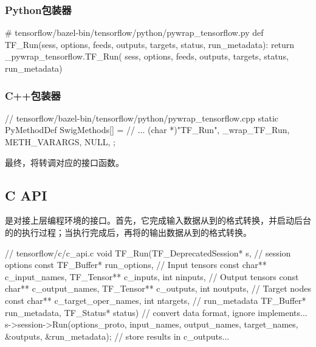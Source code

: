 \begin{content}
\subsubsection{Python包装器}

\begin{leftbar}
\begin{python}
# tensorflow/bazel-bin/tensorflow/python/pywrap\_tensorflow.py
def TF_Run(sess, options, feeds, outputs, targets, status, run_metadata):
  return _pywrap_tensorflow.TF_Run(
    sess, options, feeds, outputs, targets, status, run_metadata)
\end{python}
\end{leftbar}

\subsubsection{C++包装器}

\begin{leftbar}
\begin{c++}
// tensorflow/bazel-bin/tensorflow/python/pywrap\_tensorflow.cpp
static PyMethodDef SwigMethods[] = {
  // ...
  { (char *)"TF_Run", _wrap_TF_Run, METH_VARARGS, NULL},
};
\end{c++}
\end{leftbar}

最终，将转调对应的接口函数。

\subsection{C API}

是对接上层编程环境的接口。首先，它完成输入数据从到\cpp{}的格式转换，并启动后台的的执行过程；当执行完成后，再将的输出数据从\cpp{}到的格式转换。

\begin{leftbar}
\begin{c++}
// tensorflow/c/c\_api.c
void TF_Run(TF_DeprecatedSession* s, 
  // session options
  const TF_Buffer* run_options,
  // Input tensors
  const char** c_input_names, TF_Tensor** c_inputs, int ninputs,
  // Output tensors
  const char** c_output_names, TF_Tensor** c_outputs, int noutputs,
  // Target nodes
  const char** c_target_oper_names, int ntargets,
  // run\_metadata
  TF_Buffer* run_metadata, TF_Status* status) {
  // convert data format, ignore implements...
  s->session->Run(options_proto, input_names, output_names,
                  target_names, &outputs, &run_metadata); 
  // store results in c\_outputs...
}
\end{c++}
\end{leftbar}


\end{content}
